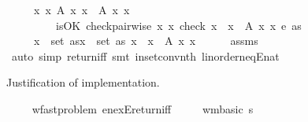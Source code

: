 \begin{isabellebody}
\ \ \ \ \ {\isachardoublequoteopen}{\isasymforall}x\ x\ A\ x\ x\ {\isasymlongleftrightarrow}\ A\ x\ x\ \isanewline
\ \ \ \ \ \ \ \ \ {\isachardoublequoteopen}isOK\ {\isacharparenleft}{\kern0pt}check{\isacharunderscore}{\kern0pt}pairwise\ {\isacharparenleft}{\kern0pt}{\isasymlambda}x\ x\ check\ {\isacharparenleft}{\kern0pt}x\ {\isasymnoteq}\ x\ {\isasymlongrightarrow}\ A\ x\ x\ e{\isacharparenright}{\kern0pt}\ as{\isacharparenright}{\kern0pt}{\isachardoublequoteclose}\ \isanewline
\ \ \ \ \ {\isachardoublequoteopen}{\isasymforall}x\ {\isasymin}\ set\ as{\isachardot}{\kern0pt}{\isasymforall}x\ {\isasymin}\ set\ as{\isachardot}{\kern0pt}\ x\ {\isasymnoteq}\ x\ {\isasymlongrightarrow}\ A\ x\ x\isanewline
%
\isadelimproof
\ \ \ \ %
\endisadelimproof
%
\isatagproof
{}\isamarkupfalse%
\ assms\ \isamarkupfalse%
\ {\isacharparenleft}{\kern0pt}auto\ simp{\isacharcolon}{\kern0pt}\ return{\isacharunderscore}{\kern0pt}iff{\isacharparenright}{\kern0pt}\ {\isacharparenleft}{\kern0pt}smt\ in{\isacharunderscore}{\kern0pt}set{\isacharunderscore}{\kern0pt}conv{\isacharunderscore}{\kern0pt}nth\ linorder{\isacharunderscore}{\kern0pt}neqE{\isacharunderscore}{\kern0pt}nat{\isacharparenright}{\kern0pt}%
\endisatagproof
{\isafoldproof}%
%
\isadelimproof
%
\endisadelimproof
%
\begin{isamarkuptext}%
Justification of implementation.%
\end{isamarkuptext}\isamarkuptrue%
\ \ \isamarkupfalse%
\ {\isacharparenleft}{\kern0pt}\ wf{\isacharunderscore}{\kern0pt}ast{\isacharunderscore}{\kern0pt}problem{\isacharparenright}{\kern0pt}\ en{\isacharunderscore}{\kern0pt}exE{\isacharunderscore}{\kern0pt}return{\isacharunderscore}{\kern0pt}iff{\isacharcolon}{\kern0pt}\isanewline
\ \ \ \ \ {\isachardoublequoteopen}wm{\isacharunderscore}{\kern0pt}basic\ s{\isachardoublequoteclose}\isanewline

\end{isabellebody}
